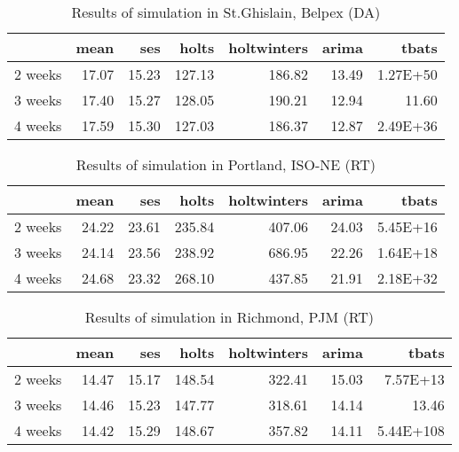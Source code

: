 \begin{table}[ht]
\centering
\begin{tabular}{rrrrrrr}
  \hline
 & mean & ses & holts & holtwinters & arima & tbats \\ 
  \hline
2 weeks & 17.07 & 15.23 & 127.13 & 186.82 & 13.49 & 1.27E+50 \\ 
  3 weeks & 17.40 & 15.27 & 128.05 & 190.21 & 12.94 & 11.60 \\ 
  4 weeks & 17.59 & 15.30 & 127.03 & 186.37 & 12.87 & 2.49E+36 \\ 
   \hline
\end{tabular}
\caption{Results of simulation in St.Ghislain, Belpex (DA)}
\end{table}
\begin{table}[ht]
\centering
\begin{tabular}{rrrrrrr}
  \hline
 & mean & ses & holts & holtwinters & arima & tbats \\ 
  \hline
2 weeks & 24.22 & 23.61 & 235.84 & 407.06 & 24.03 & 5.45E+16 \\ 
  3 weeks & 24.14 & 23.56 & 238.92 & 686.95 & 22.26 & 1.64E+18 \\ 
  4 weeks & 24.68 & 23.32 & 268.10 & 437.85 & 21.91 & 2.18E+32 \\ 
   \hline
\end{tabular}
\caption{Results of simulation in Portland, ISO-NE (RT)}
\end{table}
\begin{table}[ht]
\centering
\begin{tabular}{rrrrrrr}
  \hline
 & mean & ses & holts & holtwinters & arima & tbats \\ 
  \hline
2 weeks & 14.47 & 15.17 & 148.54 & 322.41 & 15.03 & 7.57E+13 \\ 
  3 weeks & 14.46 & 15.23 & 147.77 & 318.61 & 14.14 & 13.46 \\ 
  4 weeks & 14.42 & 15.29 & 148.67 & 357.82 & 14.11 & 5.44E+108 \\ 
   \hline
\end{tabular}
\caption{Results of simulation in Richmond, PJM (RT)}
\end{table}


